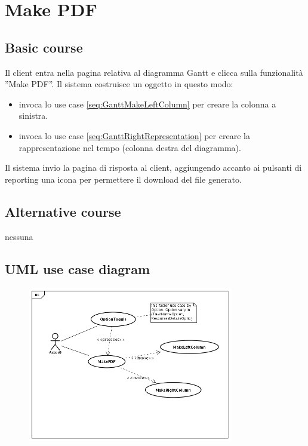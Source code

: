 \section{Make PDF}
\label{seq:GanttMakePDF}
\subsection{Basic course}
Il client entra nella pagina relativa al diagramma Gantt e clicca sulla 
funzionalit\`a ''Make PDF''. Il sistema costruisce un oggetto in questo modo:
\begin{itemize}
  \item invoca lo use case \ref{seq:GanttMakeLeftColumn} per creare la
  colonna a sinistra.
  \item invoca lo use case \ref{seq:GanttRightRepresentation} per creare
  la rappresentazione nel tempo (colonna destra del diagramma).
\end{itemize}
Il sistema invio la pagina di risposta al client, aggiungendo accanto ai
pulsanti di reporting una icona per permettere il download del file generato.  

\subsection{Alternative course}
\begin{description}
\item[nessuna]
\end{description}

\subsection{UML use case diagram}
\begin{figure}[h] \centering
\includegraphics[width=0.8\textwidth]{Gantt/img/MakePDF.png} 
\end{figure}